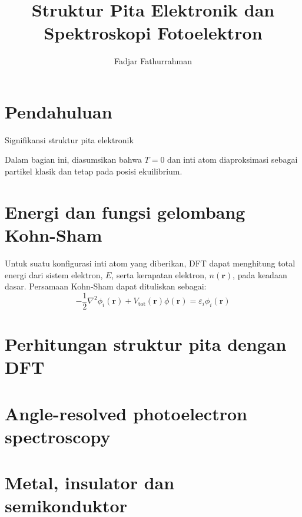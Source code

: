 \documentclass[a4paper,bahasa]{paper}
\begin{document}
\title{Struktur Pita Elektronik dan Spektroskopi Fotoelektron}
\author{Fadjar Fathurrahman}
\date{}
\maketitle

\section{Pendahuluan}

Signifikansi struktur pita elektronik

Dalam bagian ini, diasumsikan bahwa $T=0$ dan inti atom diaproksimasi sebagai
partikel klasik dan tetap pada posisi ekuilibrium.

\section{Energi dan fungsi gelombang Kohn-Sham}
%
Untuk suatu konfigurasi inti atom yang diberikan, DFT dapat menghitung
total energi dari sistem elektron, $E$, serta kerapatan elektron, $n(\mathbf{r})$,
pada keadaan dasar. Persamaan Kohn-Sham dapat dituliskan sebagai:
\begin{equation}
-\frac{1}{2}\nabla^2\phi_{i}(\mathbf{r}) + V_{\mathrm{tot}}(\mathbf{r})\phi(\mathbf{r})
= \varepsilon_{i} \phi_{i}(\mathbf{r})
\end{equation}


\section{Perhitungan struktur pita dengan DFT}


\section{Angle-resolved photoelectron spectroscopy}


\section{Metal, insulator dan semikonduktor}
\end{document}
